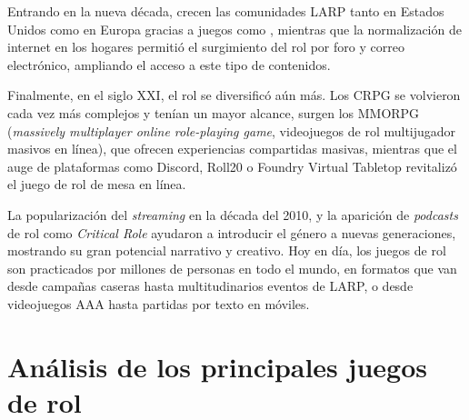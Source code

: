 \medskip

Entrando en la nueva década, crecen las comunidades LARP tanto en Estados Unidos como en Europa gracias a juegos como \cite{mindseye}, mientras que la normalización de internet en los hogares permitió el surgimiento del rol por foro y correo electrónico, ampliando el acceso a este tipo de contenidos.

\medskip

Finalmente, en el siglo XXI, el rol se diversificó aún más. Los CRPG se volvieron cada vez más complejos y tenían un mayor alcance, surgen los MMORPG (\textit{massively multiplayer online role-playing game}, videojuegos de rol multijugador masivos en línea), que ofrecen experiencias compartidas masivas, mientras que el auge de plataformas como Discord, Roll20 o Foundry Virtual Tabletop revitalizó el juego de rol de mesa en línea.

\medskip

La popularización del \textit{streaming} en la década del 2010, y la aparición de \textit{podcasts} de rol como \textit{Critical Role} ayudaron a introducir el género a nuevas generaciones, mostrando su gran potencial narrativo y creativo. Hoy en día, los juegos de rol son practicados por millones de personas en todo el mundo, en formatos que van desde campañas caseras hasta multitudinarios eventos de LARP, o desde videojuegos AAA hasta partidas por texto en móviles.

\section{Análisis de los principales juegos de rol}


